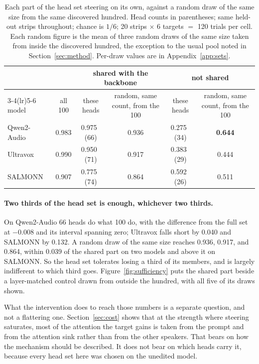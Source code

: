 \documentclass[11pt]{article}
\begin{document}
\begin{table}[t]\centering\small\setlength{\tabcolsep}{3.5pt}
\begin{tabular}{lccccc}
\toprule
 & & \multicolumn{2}{c}{shared with the backbone} & \multicolumn{2}{c}{not shared} \\
\cmidrule(lr){3-4}\cmidrule(lr){5-6}
model & all 100 & these heads & random, same count, from the 100 & these heads & random, same count, from the 100 \\
\midrule
Qwen2-Audio & 0.983 & 0.975 \,(66) & 0.936 & 0.275 \,(34) & \textbf{0.644} \\
Ultravox    & 0.990 & 0.950 \,(71) & 0.917 & 0.383 \,(29) & 0.444 \\
SALMONN     & 0.907 & 0.775 \,(74) & 0.864 & 0.592 \,(26) & 0.511 \\
\bottomrule
\end{tabular}
\caption{Each part of the head set steering on its own, against a random draw of
the same size from the same discovered hundred. Head counts in parentheses; same
held-out strips throughout; chance is $1/6$; 20 strips $\times$ 6 targets $=$ 120
trials per cell. Each random figure is the mean of three random draws of the
same size taken from inside the discovered hundred, the exception to the usual pool noted
in Section~\ref{sec:method}. Per-draw values are in
Appendix~\ref{app:sets}.}
\label{tab:sufficiency}
\end{table}

\paragraph{Two thirds of the head set is enough, whichever two thirds.}
On Qwen2-Audio 66 heads do what 100 do, with the difference from the full set at
$-0.008$ and its interval spanning zero; Ultravox falls short by 0.040 and
SALMONN by 0.132. A random draw of the same size reaches 0.936, 0.917, and 0.864,
within 0.039 of the shared part on two models and above it on SALMONN. So the
head set tolerates losing a third of its members, and is largely indifferent to
which third goes. Figure~\ref{fig:sufficiency} puts the shared part beside a
layer-matched control drawn from outside the hundred, with all five of its draws
shown.

What the intervention does to reach those numbers is a separate question, and not
a flattering one. Section~\ref{sec:cost} shows that at the strength where
steering saturates, most of the attention the target gains is taken from the
prompt and from the attention sink rather than from the other speakers. That
bears on how the mechanism should be described. It does not bear on which heads
carry it, because every head set here was chosen on the unedited model.
\end{document}
